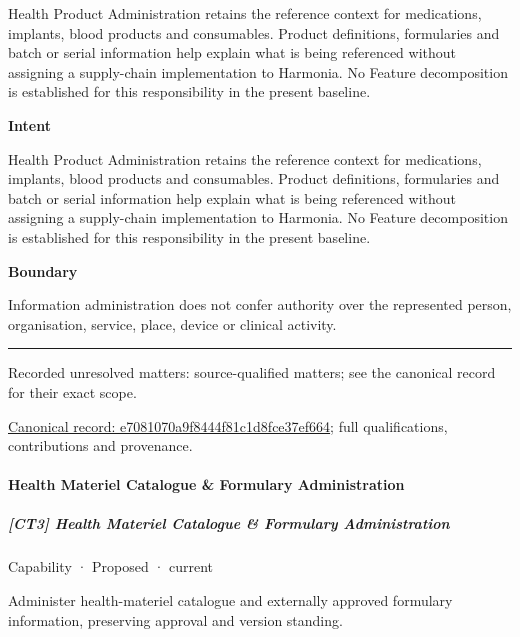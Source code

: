 Health Product Administration retains the reference context for medications, implants, blood products and consumables. Product definitions, formularies and batch or serial information help explain what is being referenced without assigning a supply-chain implementation to Harmonia. No Feature decomposition is established for this responsibility in the present baseline.



\textbf{Intent}



Health Product Administration retains the reference context for medications, implants, blood products and consumables. Product definitions, formularies and batch or serial information help explain what is being referenced without assigning a supply-chain implementation to Harmonia. No Feature decomposition is established for this responsibility in the present baseline.



\textbf{Boundary}



Information administration does not confer authority over the represented person, organisation, service, place, device or clinical activity.



\medskip\hrule\medskip

{\small Recorded unresolved matters: source-qualified matters; see the canonical record for their exact scope.}\par
{\footnotesize \href{../../../../continuum/strategy/capability/e7081070a9f8444f81c1d8fce37ef664.md}{Canonical record: e7081070a9f8444f81c1d8fce37ef664}; full qualifications, contributions and provenance.}\par
\paragraph{Health Materiel Catalogue \& Formulary Administration}

\subparagraph{[CT3] Health Materiel Catalogue \& Formulary Administration}

\label{element:28b327760af94b8b986357469524d793}
{\small Capability · Proposed · current}\par

Administer health-materiel catalogue and externally approved formulary information, preserving approval and version standing.




